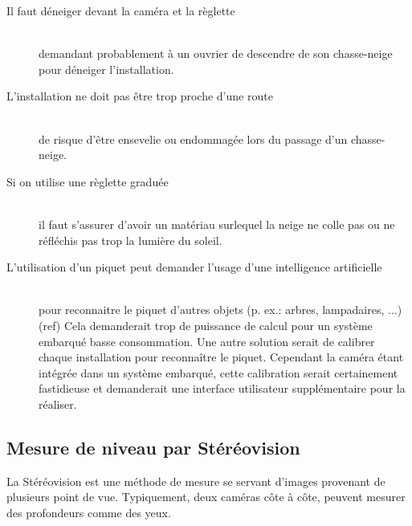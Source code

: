 \begin{description}
    \item[Il faut déneiger devant la caméra et la règlette] \hfill \\
    demandant probablement à un ouvrier de descendre de son chasse-neige pour déneiger l'installation.
    \item[L'installation ne doit pas être trop proche d'une route] \hfill \\ 
    de risque d'être ensevelie ou endommagée lors du passage d'un chasse-neige.
    \item[Si on utilise une règlette graduée] \hfill \\ 
    il faut s'assurer d'avoir un matériau surlequel la neige ne colle pas ou 
    ne réfléchis pas trop la lumière du soleil.
    \item[L'utilisation d'un piquet peut demander l'usage d'une intelligence artificielle] \hfill \\
    pour reconnaitre le piquet d'autres objets (p. ex.: arbres, lampadaires, ...) (ref\footnotemark[2])
    Cela demanderait trop de puissance de calcul pour un système embarqué basse consommation.
    Une autre solution serait de calibrer chaque installation pour reconnaître le piquet.
    Cependant la caméra étant intégrée dans un système embarqué, cette calibration serait certainement
    fastidieuse et demanderait une interface utilisateur supplémentaire pour la réaliser.
\end{description}
\newpage

\subsection{Mesure de niveau par Stéréovision}
La Stéréovision est une méthode de mesure se servant d'images provenant de plusieurs point de vue.
Typiquement, deux caméras côte à côte, peuvent mesurer des profondeurs comme des yeux.

